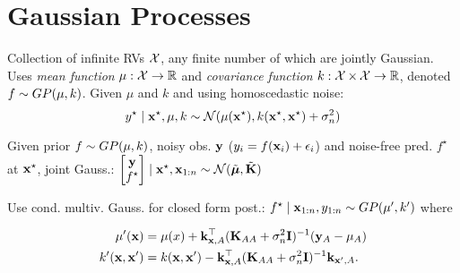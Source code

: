 \section{Gaussian Processes}

\begin{definition}[GP]
    Collection of infinite RVs \(\operatorname{\mathcal{X}}\), any finite number of which are jointly Gaussian. Uses
    \textit{mean function} \(\mu: \operatorname{\mathcal{X}} \to \mathbb{R}\) and \textit{covariance function} \(k: \operatorname{\mathcal{X}} \times \operatorname{\mathcal{X}} \to \mathbb{R}\), denoted \(f \sim GP(\mu, k)\).
    Given \(\mu\) and \(k\) and using homoscedastic noise:
    \[y^\star \mid \vb{x}^\star, \mu, k \sim \operatorname{\mathcal{N}}(\mu(\vb{x}^\star), k(\vb{x}^\star, \vb{x}^\star) + \sigma_n^2)\]
\end{definition}

\begin{definition}[Inference]
    Given prior \(f \sim GP(\mu, k)\), noisy obs. \(\vb{y}\) (\(y_i = f(\vb{x}_i) + \epsilon_i\)) and noise-free pred. \(f^\star\) at \(\vb{x}^\star\), joint Gauss.: \(\begin{bmatrix}
        \vb{y} \\ f^\star 
    \end{bmatrix}\mid \vb{x}^\star, \vb{x}_{1:n} \sim \operatorname{\mathcal{N}}(\tilde{\vb*{\mu}}, \tilde{\vb{K}})\)

\end{definition}

\begin{definition}[Posterior]
    Use {\color{H3} cond. multiv. Gauss.} for closed form post.:
    \(f^\star \mid \vb{x}_{1:n}, y_{1:n} \sim GP(\mu', k')\) where
    \begin{footnotesize}\vspace{-5pt}
        \begin{align*}
            \mu'(\vb{x}) &= \mu(x) + \vb{k}_{\vb{x}, A}^\top(\vb{K}_{AA} + \sigma_n^2\vb{I})^{-1}(\vb{y}_A - \mu_A) \\
            k'(\vb{x}, \vb{x}') &= k(\vb{x}, \vb{x}') - \vb{k}_{\vb{x}, A}^\top (\vb{K}_{AA} + \sigma_n^2\vb{I})^{-1}\vb{k}_{\vb{x}', A}.
        \end{align*}
    \end{footnotesize}
\end{definition}

